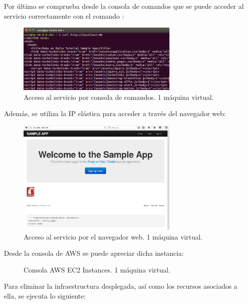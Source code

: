 Por último se comprueba desde la consola de comandos que se puede acceder al servicio correctamente con el comando :

\begin{figure}[H]
\centering
\includegraphics[width=0.7\textwidth]{images/figures/curl-aws-1.png}
\caption{Acceso al servicio por consola de comandos. 1 máquina virtual.\label{fig:figure_placement_example}}
\end{figure}

Además, se utiliza la IP elástica para acceder a través del navegador web:

\begin{figure}[H]
\centering
\includegraphics[width=0.7\textwidth]{images/figures/access-aws-1.png}
\caption{Acceso al servicio por el navegador web. 1 máquina virtual.\label{fig:figure_placement_example}}
\end{figure}

Desde la consola de AWS se puede apreciar dicha instancia:

\begin{figure}[H]
\caption{Consola AWS EC2 Instances. 1 máquina virtual.\label{fig:figure_placement_example}}
\end{figure}

Para eliminar la infraestructura desplegada, así como los recursos asociados a ella, se ejecuta lo siguiente:


